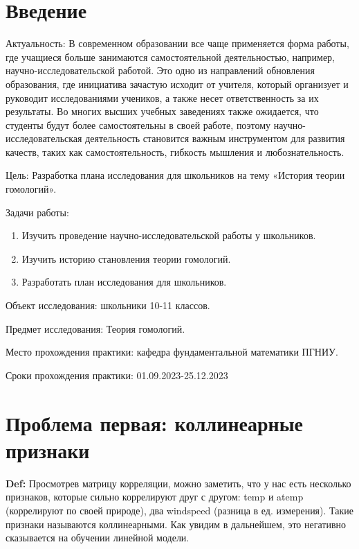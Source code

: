\documentclass[12pt, openany, oneside]{book}
\theoremstyle{definition}
\theoremstyle{remark}
\numberwithin{equation}{section}
\numberwithin{equation}{section}
\newcommand{\0}{\varnothing}
\begin{document}
	\chapter*{Введение} %
	
	Актуальность: В современном образовании все чаще применяется форма работы, где учащиеся больше занимаются самостоятельной деятельностью, например, научно-исследовательской работой. Это одно из направлений обновления образования, где инициатива зачастую исходит от учителя, который организует и руководит исследованиями учеников, а также несет ответственность за их результаты. Во многих высших учебных заведениях также ожидается, что студенты будут более самостоятельны в своей работе, поэтому научно-исследовательская деятельность становится важным инструментом для развития качеств, таких как самостоятельность, гибкость мышления и любознательность.
	
	Цель: Разработка плана исследования для школьников на тему «История теории гомологий».
	
	Задачи работы:
	\begin{enumerate} 
		\item Изучить проведение научно-исследовательской работы у школьников.
		\item Изучить историю становления теории гомологий.
		\item Разработать план исследования для школьников.
	\end{enumerate}
	
	Объект исследования: школьники 10-11 классов.
	
	Предмет исследования: Теория гомологий.
	
	Место прохождения практики: кафедра фундаментальной математики ПГНИУ.
	
	Сроки прохождения практики: 01.09.2023-25.12.2023
	
	\chapter{Проблема первая: коллинеарные признаки}
	\textbf{Def:} Просмотрев матрицу корреляции, можно заметить, что у нас есть несколько признаков, которые сильно коррелируют друг с другом: temp и atemp (коррелируют по своей природе), два windspeed (разница в ед. измерения). Такие признаки называются коллинеарными. Как увидим в дальнейшем, это негативно сказывается на обучении линейной модели.
	
\end{document}

